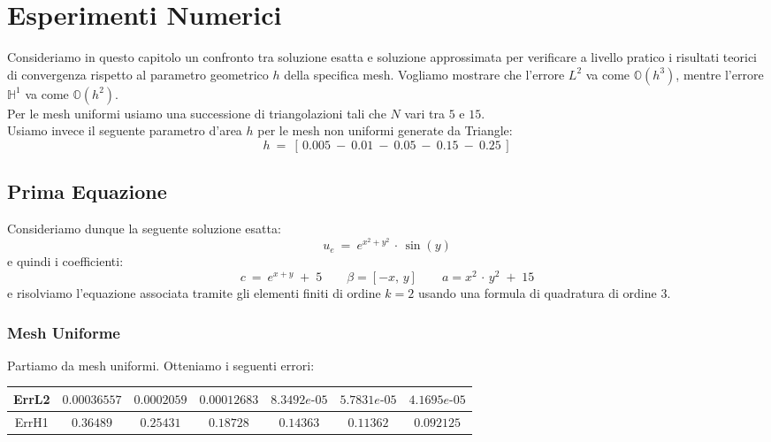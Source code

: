 \documentclass[12pt,a4paper]{report}
\theoremstyle{theorem}
\theoremstyle{theorem}
\theoremstyle{definition}
\begin{document}
\chapter{Esperimenti Numerici}
Consideriamo in questo capitolo un confronto tra soluzione esatta e soluzione approssimata per verificare a livello pratico i risultati teorici di convergenza rispetto al parametro geometrico $h$ della specifica mesh. Vogliamo mostrare che l'errore $L^{2}$ va come  $\mathbb{O}(h^{3})$, mentre l'errore $\mathbb{H}^{1}$ va come  $\mathbb{O}(h^{2})$. \\
Per le mesh uniformi usiamo una successione di triangolazioni tali che $N$ vari tra $5$ e $15$.\\
Usiamo invece il seguente parametro d'area $h$ per le mesh non uniformi generate da Triangle:
\[ 
h \ = \ [ \, 0.005 \ - \ 0.01 \ - \ 0.05 \ - \ 0.15 \ - \ 0.25 \, ] 
\]

\section{Prima Equazione}
Consideriamo dunque la seguente soluzione esatta:
\[ u_e \ = \ e^{x^{2} + y^{2}} \, \cdot \, \sin(y)\]
e quindi i coefficienti:
\[ c \ = \ e^{x + y} \; + \; 5 \qquad \beta = [-x, \, y] \qquad a = x^{2} \, \cdot \, y^{2} \; + \; 15 \]
e risolviamo l'equazione associata tramite gli elementi finiti di ordine $k = 2$ usando una formula di quadratura di ordine $3$. 

\subsection{Mesh Uniforme}
Partiamo da mesh uniformi. Otteniamo i seguenti errori:
\hfill \\
\begin{table}[!h]
\centering
\begin{tabular}{ | c | c | c | c | c | c | c | }
\hline
ErrL2	&	$0.00036557$ & $0.0002059$ & $0.00012683$ & $8.3492e\text{-}05$  & $5.7831e\text{-}05$ & $4.1695e\text{-}05$ \\ \hline 
ErrH1	&	$0.36489$ &	$0.25431$	 & $0.18728$	 & $0.14363$ & $0.11362$ & $0.092125$ \\ \hline 
\end{tabular}
\end{table}
\end{document}
